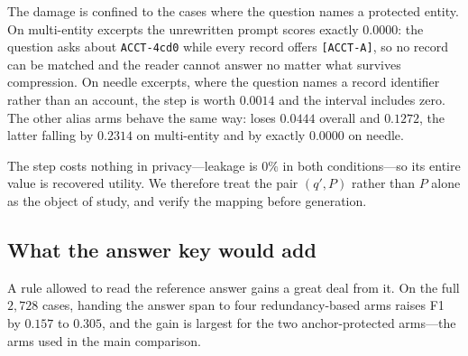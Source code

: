 \begin{center}\small
\setlength{\tabcolsep}{4pt}
\end{center}

The damage is confined to the cases where the question names a protected entity. On
multi-entity excerpts the unrewritten prompt scores exactly $0.0000$: the question asks about
\texttt{ACCT-4cd0} while every record offers \texttt{[ACCT-A]}, so no record can be matched
and the reader cannot answer no matter what survives compression. On needle excerpts, where
the question names a record identifier rather than an account, the step is worth $0.0014$ and
the interval includes zero. The other alias arms behave the same way: 
loses $0.0444$ overall and  $0.1272$, the latter falling by $0.2314$
on multi-entity and by exactly $0.0000$ on needle.

The step costs nothing in privacy---leakage is $0\%$ in both conditions---so its entire value
is recovered utility. We therefore treat the pair $(q',P)$ rather than $P$ alone as the object
of study, and verify the mapping before generation.

\subsection{What the answer key would add}
A rule allowed to read the reference answer gains a great deal from it. On the full
$2{,}728$ cases, handing the answer span to four redundancy-based arms raises F1 by
$0.157$ to $0.305$, and the gain is largest for the two anchor-protected arms---the arms used
in the main comparison.

\begin{center}\small
\setlength{\tabcolsep}{4pt}
\end{center}

